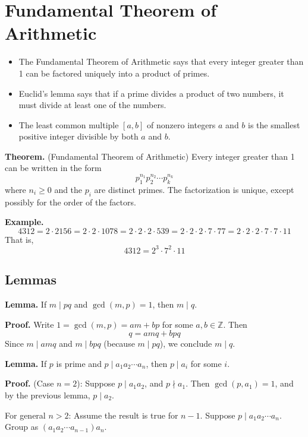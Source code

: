 \section{Fundamental Theorem of Arithmetic}

\begin{itemize}
  \item The Fundamental Theorem of Arithmetic says that every integer greater than 1 can be factored uniquely into a product of primes.
  \item Euclid’s lemma says that if a prime divides a product of two numbers, it must divide at least one of the numbers.
  \item The least common multiple $[a, b]$ of nonzero integers $a$ and $b$ is the smallest positive integer divisible by both $a$ and $b$.
\end{itemize}

\textbf{Theorem.} (Fundamental Theorem of Arithmetic)  
Every integer greater than 1 can be written in the form
\[
p_1^{n_1}p_2^{n_2} \cdots p_k^{n_k}
\]
where $n_i \geq 0$ and the $p_i$ are distinct primes. The factorization is unique, except possibly for the order of the factors.

\textbf{Example.}
\[
4312 = 2 \cdot 2156 = 2 \cdot 2 \cdot 1078 = 2 \cdot 2 \cdot 2 \cdot 539 = 2 \cdot 2 \cdot 2 \cdot 7 \cdot 77 = 2 \cdot 2 \cdot 2 \cdot 7 \cdot 7 \cdot 11
\]
That is,
\[
4312 = 2^3 \cdot 7^2 \cdot 11
\]

\subsection{Lemmas}

\textbf{Lemma.} If $m \mid pq$ and $\gcd(m, p) = 1$, then $m \mid q$.

\textbf{Proof.} Write $1 = \gcd(m, p) = am + bp$ for some $a, b \in \mathbb{Z}$.  
Then
\[
q = amq + bpq
\]
Since $m \mid amq$ and $m \mid bpq$ (because $m \mid pq$), we conclude $m \mid q$.

\bigskip

\textbf{Lemma.} If $p$ is prime and $p \mid a_1a_2 \cdots a_n$, then $p \mid a_i$ for some $i$.

\textbf{Proof.} (Case $n=2$): Suppose $p \mid a_1a_2$, and $p \nmid a_1$.  
Then $\gcd(p, a_1) = 1$, and by the previous lemma, $p \mid a_2$.

For general $n > 2$: Assume the result is true for $n-1$. Suppose $p \mid a_1a_2 \cdots a_n$.  
Group as $(a_1a_2 \cdots a_{n-1})a_n$.

